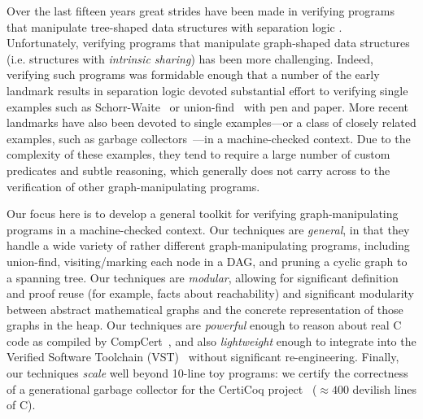 Over the last fifteen years great strides have been made in verifying programs that manipulate
tree-shaped data structures with separation logic
\cite{berdine:smallfoot,chin:hipsleek,jacobs:verifast,chlipala:bedrock,bengtson:charge,appel:programlogics}.  Unfortunately, verifying programs that manipulate graph-shaped data structures (i.e. structures with \emph{intrinsic sharing}) has been more challenging.  Indeed, verifying such programs was formidable enough that a number of the early landmark results in separation logic devoted substantial effort to verifying single examples such as Schorr-Waite~\cite{hongseok:phd} or union-find~\cite{NeelThesis} with pen and paper.  More recent landmarks have also been devoted to single examples---or a class of closely related examples, such as garbage collectors~\cite{A,CakeMLGC,C}---in a machine-checked context.
Due to the complexity of these examples, they tend to require a large number of custom predicates and subtle reasoning, which generally does not carry across to the verification of other graph-manipulating programs.

Our focus here is to develop a general toolkit for verifying graph-manipulating programs in a machine-checked context.  Our techniques are \emph{general}, in that they handle a wide variety of rather different graph-manipulating programs, including union-find, visiting/marking each node in a DAG, and pruning a cyclic graph to a spanning tree.
Our techniques are \emph{modular}, allowing for significant definition and proof reuse (for example, facts about reachability) and significant modularity between abstract mathematical graphs and the concrete representation of those graphs in the heap.
Our techniques are \emph{powerful} enough to reason about real C code as compiled by CompCert~\cite{blah}, and also \emph{lightweight} enough to integrate into the Verified Software Toolchain (VST)~\cite{appel:programlogics} without significant re-engineering.
Finally, our techniques \emph{scale} well beyond 10-line toy programs: we certify the correctness of a generational garbage collector for the CertiCoq project~\cite{blah} ($\approx 400$ devilish lines of C).


